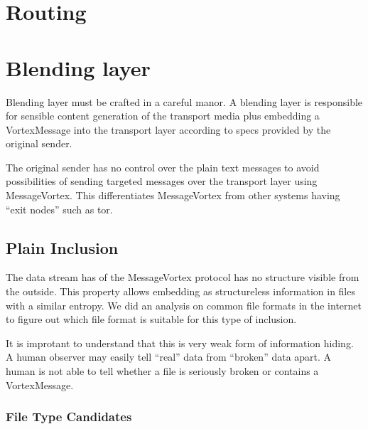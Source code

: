 \section{Routing}





\section{Blending layer}
Blending layer must be crafted in a careful manor. A blending layer is responsible for sensible content generation of the transport media plus embedding a VortexMessage into the transport layer according to specs provided by the original sender.

The original sender has no control over the plain text messages to avoid possibilities of sending targeted messages over the transport layer using MessageVortex. This differentiates MessageVortex from other systems having ``exit nodes'' such as tor.


\subsection{Plain Inclusion}
The data stream has of the MessageVortex protocol has no structure visible from the outside. This property allows embedding as structureless information in files with a similar entropy. We did an analysis on common file formats in the internet to figure out which file format is suitable for this type of inclusion.

It is improtant to understand that this is very weak form of information hiding. A human observer may easily tell ``real'' data from ``broken'' data apart. A human is not able to tell whether a file is seriously broken or contains a VortexMessage.

\subsubsection{File Type Candidates}

